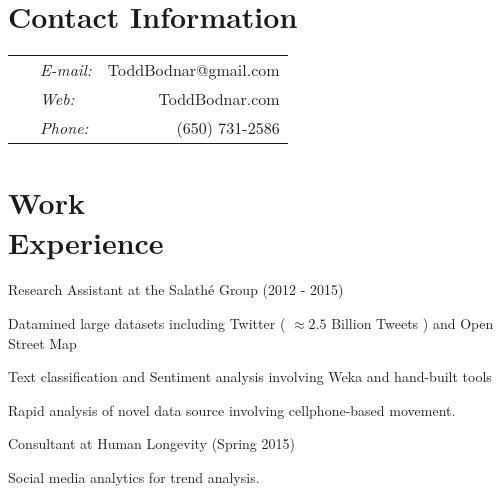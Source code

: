 \documentclass[margin,line]{res}
\newenvironment{list1}{
  \begin{list}{\ding{113}}{%
      \setlength{\itemsep}{0in}
      \setlength{\parsep}{0in} \setlength{\parskip}{0in}
      \setlength{\topsep}{0in} \setlength{\partopsep}{0in} 
      \setlength{\leftmargin}{0.17in}}}{\end{list}}
\begin{document}

\begin{resume}
\section{\sc Contact Information}
\vspace{.05in}
\begin{tabular}{@{}p{3.7in}p{.5in} r }
\   &  {\it E-mail:}  & ToddBodnar@gmail.com \\         
\   &  {\it Web:}  & ToddBodnar.com \\
\  & {\it Phone:} & (650) 731-2586 \\
\end{tabular}


\section{\sc  Work \\ Experience}
Research Assistant at the Salath\'e Group (2012 - 2015)
\begin{list1}
\item[] Datamined large datasets including Twitter  ( \(\approx 2.5\) Billion Tweets ) and Open Street Map 
\item[] Text classification and Sentiment analysis involving Weka and hand-built tools
\item[] Rapid analysis of novel data source involving cellphone-based movement. %
\end{list1}

Consultant at Human Longevity (Spring 2015)
\begin{list1}
\item[] Social media analytics for trend analysis. 
\end{list1}


\end{resume}
\end{document}
